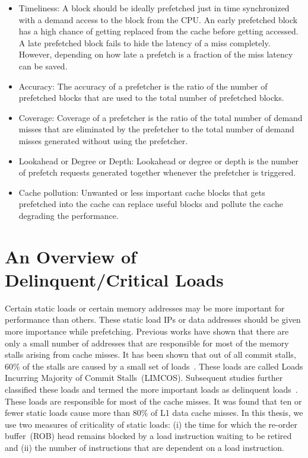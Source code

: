 \begin{itemize}
\item Timeliness: A block should be ideally prefetched just in time synchronized with a demand access to the block from the CPU. An early prefetched block has a high chance of getting replaced from the cache before getting accessed. A late prefetched block fails to hide the latency of a miss completely. However, depending on how late a prefetch is a fraction of the miss latency can be saved.

\item Accuracy: The accuracy of a prefetcher is the ratio of the number of prefetched blocks that are used to the total number of prefetched blocks.

\item Coverage: Coverage of a prefetcher is the ratio of the total number of demand misses that are eliminated by the prefetcher to the total number of demand misses generated without using the prefetcher.

\item Lookahead or Degree or Depth: Lookahead or degree or depth is the number of prefetch requests generated together whenever the prefetcher is triggered.

\item Cache pollution: Unwanted or less important cache blocks that gets prefetched into the cache can replace useful blocks and pollute the cache degrading the performance.
\end {itemize}


\section{An Overview of Delinquent/Critical Loads}

Certain static loads or certain memory addresses may be more important for performance than others. These static load IPs or data addresses should 
be given more importance while prefetching.
Previous works have shown that there are only a small number of addresses that are responsible for most of the memory stalls arising from cache misses. It has been shown that out of all commit stalls, 60\% of the stalls are caused by a small set of loads~\cite{performance oriented prefetching}. These loads are called Loads Incurring Majority of Commit Stalls~(LIMCOS). Subsequent studies further classified these loads and termed the more important loads as delinquent loads~\cite{Long-range prefetching}. These loads are responsible for most of the cache misses. It was found that ten or fewer static loads cause more than 80\% of L1 data cache misses.
In this thesis, we use two measures of criticality of static loads: (i) the time for which the re-order buffer~(ROB) head remains blocked by a load instruction waiting to be retired and (ii) the number of instructions that are dependent on a load instruction.


